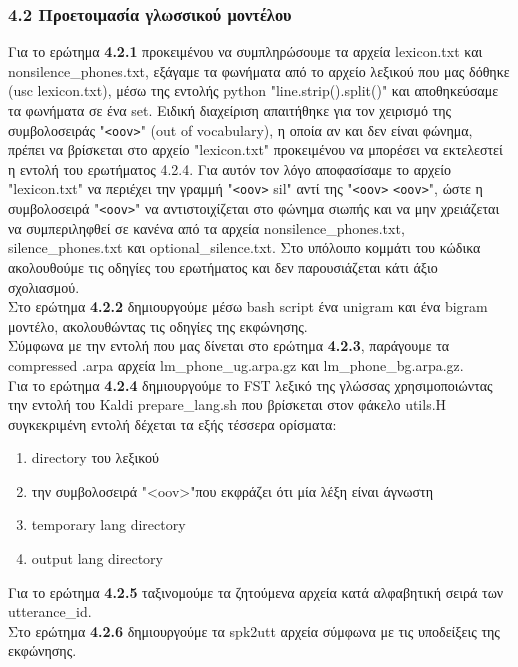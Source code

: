 \documentclass{article}
\begin{document}
\subsubsection*{4.2 Προετοιμασία γλωσσικού μοντέλου}
%
Για το ερώτημα \textbf{4.2.1} προκειμένου να συμπληρώσουμε τα αρχεία lexicon.txt και nonsilence\_phones.txt, εξάγαμε τα φωνήματα από το αρχείο λεξικού που μας δόθηκε (usc lexicon.txt), μέσω της εντολής python "line.strip().split()" και αποθηκεύσαμε τα φωνήματα σε ένα set. Ειδική διαχείριση απαιτήθηκε για τον χειρισμό της συμβολοσειράς "\texttt{<oov>}" (out of vocabulary), η οποία αν και δεν είναι φώνημα, πρέπει να βρίσκεται στο αρχείο "lexicon.txt" προκειμένου να μπορέσει να εκτελεστεί η εντολή του ερωτήματος 4.2.4. Για αυτόν τον λόγο αποφασίσαμε το αρχείο "lexicon.txt" να περιέχει την γραμμή "\texttt{<oov>} sil" αντί της "\texttt{<oov>} \texttt{<oov>}", ώστε η συμβολοσειρά "\texttt{<oov>}" να αντιστοιχίζεται στο φώνημα σιωπής και να μην χρειάζεται να συμπεριληφθεί σε κανένα από τα αρχεία nonsilence\_phones.txt, silence\_phones.txt και optional\_silence.txt. Στο υπόλοιπο κομμάτι του κώδικα ακολουθούμε τις οδηγίες του ερωτήματος και δεν παρουσιάζεται κάτι άξιο σχολιασμού.
%
%
\\[8mm]
%
%
Στο ερώτημα \textbf{4.2.2} δημιουργούμε μέσω bash script ένα unigram και ένα bigram μοντέλο, ακολουθώντας τις οδηγίες της εκφώνησης.
%
%
\\[8mm]
%
%
Σύμφωνα με την εντολή που μας δίνεται στο ερώτημα \textbf{4.2.3}, παράγουμε τα compressed .arpa αρχεία lm\_phone\_ug.arpa.gz και lm\_phone\_bg.arpa.gz. 
%
%
\\[8mm]
%
%
Για το ερώτημα \textbf{4.2.4} δημιουργούμε το FST λεξικό της γλώσσας χρησιμοποιώντας την
εντολή του Kaldi prepare\_lang.sh που βρίσκεται στον φάκελο utils.Η συγκεκριμένη εντολή δέχεται τα εξής τέσσερα ορίσματα:
\begin{enumerate}
    \item {directory του λεξικού}
    \item {την συμβολοσειρά "<oov>"που εκφράζει ότι μία λέξη είναι άγνωστη}
    \item {temporary lang directory}
    \item {output lang directory}
    
\end{enumerate}
%
%
\vspace*{8mm}
%
%
Για το ερώτημα \textbf{4.2.5} ταξινομούμε τα ζητούμενα αρχεία κατά αλφαβητική σειρά των utterance\_id.
%
%
\\[8mm]
%
%
Στο ερώτημα \textbf{4.2.6} δημιουργούμε τα spk2utt αρχεία σύμφωνα με τις υποδείξεις της εκφώνησης.
\end{document}
